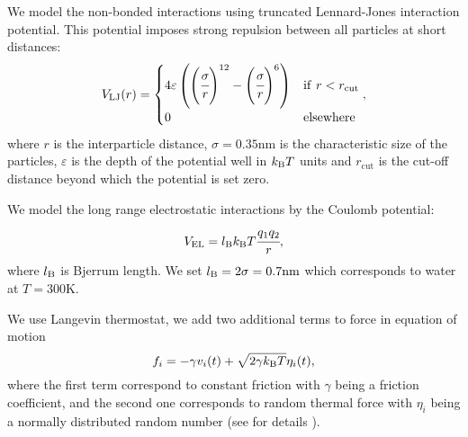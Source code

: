 \documentclass{elsarticle}
\begin{document}
We model the non-bonded interactions using truncated Lennard-Jones interaction potential.
This potential imposes strong repulsion between all particles at short distances:
\begin{equation}
    \begin{split}\label{eq:LJ}
        V_\mathrm{LJ}(r) =
        \begin{cases}
            4 \varepsilon \left( \left(\cfrac{\sigma}{r}\right)^{12}
            - \left(\cfrac{\sigma}{r}\right)^6\right)
            & \mathrm{if~} r < r_\mathrm{cut}\\
            0
            & \mathrm{elsewhere}
        \end{cases},
    \end{split}
\end{equation}
where $r$ is the interparticle distance,
$\sigma = 0.35 \mathrm{nm}$ is the characteristic size of the particles,
$\varepsilon$ is the depth of the potential well in $k_\mathrm{B}T$ units and $r_\mathrm{cut}$ is the cut-off distance beyond which the potential is set zero.

We model the long range electrostatic interactions by the Coulomb potential:
\begin{equation}
    V_{\mathrm{EL}}=l_\mathrm{B}k_\mathrm{B}T \cfrac{q_{1}q_{2}}{r},
\end{equation}
where $l_\mathrm{B}$ is Bjerrum length. We set $l_\mathrm{B} = 2\sigma = 0.7 \mathrm{nm}$ which corresponds to water at $T=300 \mathrm{K}$.


We use Langevin thermostat, \ie
we add two additional terms to force in equation of motion
\begin{equation}
f_i =  -\gamma v_i(t)+\sqrt{2\gamma k_\mathrm{B}T }\eta_i(t),
\end{equation}
where the first term correspond to constant friction with $\gamma$ being a friction coefficient, and the second one corresponds to random thermal force with $\eta_i$ being a normally distributed random number (see for details \cite{Grest1986}).




\end{document}
